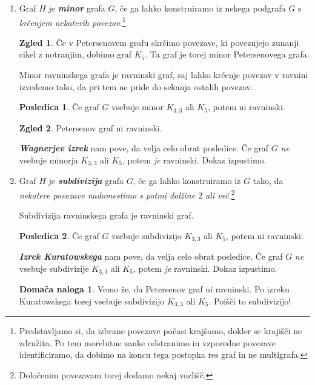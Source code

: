 \documentclass[11pt]{book}
\def\definicija{\color{rdeca}\bf\em}
\theoremstyle{definition}
\theoremstyle{zgled}
\newtheorem*{zgled}{Zgled}
\theoremstyle{odprtproblem}
\theoremstyle{domacanaloga}
\newtheorem*{domacanaloga}{Domača naloga}
\theoremstyle{izrek}
\newtheorem*{posledica}{Posledica}
\begin{document}
\begin{enumerate}
    \item Graf $H$ je {\definicija minor} grafa $G$, če ga lahko konstruiramo iz nekega podgrafa $G$ s \emph{krčenjem nekaterih povezav}.\footnote{Predstavljamo si, da izbrane povezave počasi krajšamo, dokler se krajišči ne združita. Po tem morebitne zanke odstranimo in vzporedne povezave identificiramo, da dobimo na koncu tega postopka res graf in ne multigrafa.}
    
    \begin{zgled}
        Če v Petersenovem grafu skrčimo povezave, ki povezujejo zunanji cikel z notranjim, dobimo graf $K_5$. Ta graf je torej minor Petersenovega grafa.
    \end{zgled}
        
    Minor ravninskega grafa je ravninski graf, saj lahko krčenje povezav v ravnini izvedemo tako, da pri tem ne pride do sekanja ostalih povezav.

    \begin{posledica}
        Če graf $G$ vsebuje minor $K_{3,3}$ ali $K_5$, potem ni ravninski.
    \end{posledica}

    \begin{zgled}
        Petersenov graf ni ravninski.
    \end{zgled}

    {\definicija Wagnerjev izrek} nam pove, da velja celo obrat posledice. Če graf $G$ \emph{ne} vsebuje minorja $K_{3,3}$ ali $K_5$, potem \emph{je} ravninski. Dokaz izpustimo.

    \item Graf $H$ je {\definicija subdivizija} grafa $G$, če ga lahko konstruiramo iz $G$ tako, da \emph{nekatere povezave nadomestimo s potmi dolžine $2$ ali več}.\footnote{Določenim povezavam torej dodamo nekaj vozlišč.}
        
    Subdivizija ravninskega grafa je ravninski graf.

    \begin{posledica}
        Če graf $G$ vsebuje subdivizijo $K_{3,3}$ ali $K_5$, potem ni ravninski.
    \end{posledica}

    {\definicija Izrek Kuratowskega} nam pove, da velja celo obrat posledice. Če graf $G$ \emph{ne} vsebuje subdivizije $K_{3,3}$ ali $K_5$, potem \emph{je} ravninski. Dokaz izpustimo.

    \begin{domacanaloga}
        Vemo že, da Petersenov graf ni ravninski. Po izreku Kuratowskega torej vsebuje subdivizijo $K_{3,3}$ ali $K_5$. Poišči to subdivizijo!
    \end{domacanaloga}
\end{enumerate}
\end{document}

